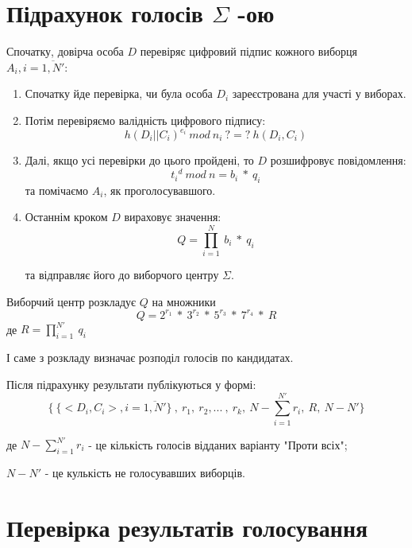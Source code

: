 \documentclass[12pt]{report}
\theoremstyle{plain}
\theoremstyle{definition}
\theoremstyle{remark}
\begin{document}
\section{Підрахунок голосів $\Sigma$ -ою}

Спочатку, довірча особа $D$ перевіряє цифровий підпис кожного виборця $A_i, i=\overline{1,N'}$:
\begin{enumerate}
    \item Спочатку йде перевірка, чи була особа $D_i$ зареєстрована для участі у виборах.
    \item Потім перевіряємо валідність цифрового підпису: 
    \[h(D_i||C_i)^{e_i}\ mod\ n_i\ ?=?\ h(D_i, C_i) \]
    
    \item Далі, якщо усі перевірки до цього пройдені, то $D$ розшифровує повідомлення:
    \[ {t_i}^d\ mod\ n = b_i\ *\ q_i\]
    та помічаємо $A_i$, як проголосувавшого.

    \item Останнім кроком $D$ вираховує значення:
    \[ Q = \prod_{i=1}^N \ b_i\ *\ q_i\]

    та відправляє його до виборчого центру $\Sigma$.
\end{enumerate}

Виборчий центр розкладує $Q$ на множники 
\[ Q = 2^{r_1}\ *\ 3^{r_2}\ *\ 5^{r_3}\ *\ 7^{r_4}\ *\ R\]
де $R = \prod_{i=1}^{N'}\ q_i$

І саме з розкладу визначає розподіл голосів по кандидатах.

Після підрахунку результати публікуються у формі:
\[ \{\ \{<D_i,C_i>, i=\overline{1,N'}\}\ ,\ r_1,\ r_2, ...\ ,\ r_k,\ N-\sum_{i=1}^{N'}r_i ,\ R,\ N-N' \} \]

де $N-\sum_{i=1}^{N'}r_i$ - це кількість голосів відданих варіанту "Проти всіх";

$N-N'$ - це кулькість не голосувавших виборців.

\section{Перевірка результатів голосування}
\end{document}
